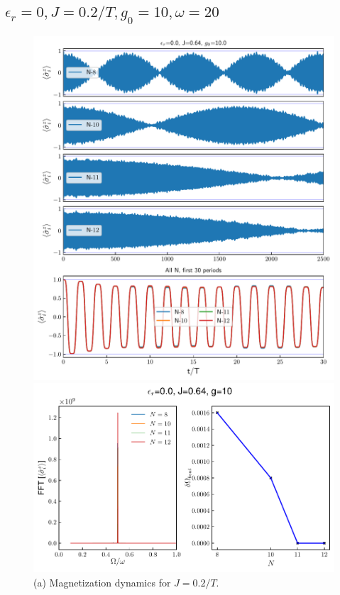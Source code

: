 \documentclass[a4paper, 11pt]{article}
\begin{document}
\subsection{$\epsilon_r = 0, J = 0.2/T, g_0 = 10, \omega = 20$}
\begin{figure}[h!]
    \centering
    \begin{minipage}[t]{0.48\textwidth}
        \centering
        \includegraphics[width=\textwidth]{time_mag_epsilon_r0.00_J0.64_g10.0_allN.pdf}
        \caption*{(a) Magnetization dynamics for $J = 0.2/T$.}
    \end{minipage}
    \hfill
    \begin{minipage}[t]{0.48\textwidth}
        \centering
        \includegraphics[width=\textwidth]{DTC_mag_fft_beat_er=0.0_J=0.6366197723675814_g=10.0.pdf}

\end{minipage}
\end{figure}
\end{document}

